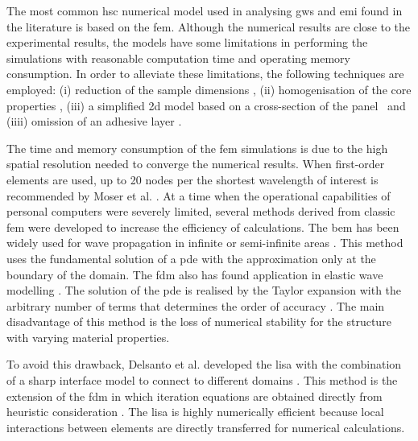 \documentclass[a4paper,fleqn]{cas-dc}
\begin{document}
The most common \ac{hsc} numerical model used in analysing \acp{gw} and \ac{emi} found in the literature is based on the \ac{fem}.
Although the numerical results are close to the experimental results, the models have some limitations in performing the simulations with reasonable computation time and operating memory consumption.
In order to alleviate these limitations, the following techniques are employed: (i) reduction of the sample dimensions \cite{hosseini2013numerical, tian2015wavenumber}, (ii) homogenisation of the core properties \cite{catapano2014multi, zhou2020debonding}, (iii) a simplified \acl{2d} model based on a cross-section of the panel~ \cite{li2019detection} and (iiii) omission of an adhesive layer \cite{mustapha2013non}.

The time and memory consumption of the \ac{fem} simulations is due to the high spatial resolution needed to converge the numerical results.
When first-order elements are used, up to 20 nodes per the shortest wavelength of interest is recommended by Moser et al. \cite{moser1999modeling}.
At a time when the operational capabilities of personal computers were severely limited, several methods derived from classic \ac{fem} were developed to increase the efficiency of calculations.
The \ac{bem} has been widely used for wave propagation in infinite or semi-infinite areas \cite{brebbia1984boundary}.
This method uses the fundamental solution of a \ac{pde} with the approximation only at the boundary of the domain.
The \ac{fdm} also has found application in elastic wave modelling \cite{delsantoO1992connection}.
The solution of the \ac{pde} is realised by the Taylor expansion with the arbitrary number of terms that determines the order of accuracy \cite{willberg2015simulation}.
The main disadvantage of this method is the loss of numerical stability for the structure with varying material properties.

To avoid this drawback, Delsanto et al. developed the \ac{lisa} with the combination of a sharp interface model to connect to different domains \cite{delsantoO1992connection}. This method is the extension of the \ac{fdm} in which iteration equations are obtained directly from heuristic consideration \cite{willberg2015simulation}.
The \ac{lisa} is highly numerically efficient because local interactions between elements are directly transferred for numerical calculations.
\end{document}
